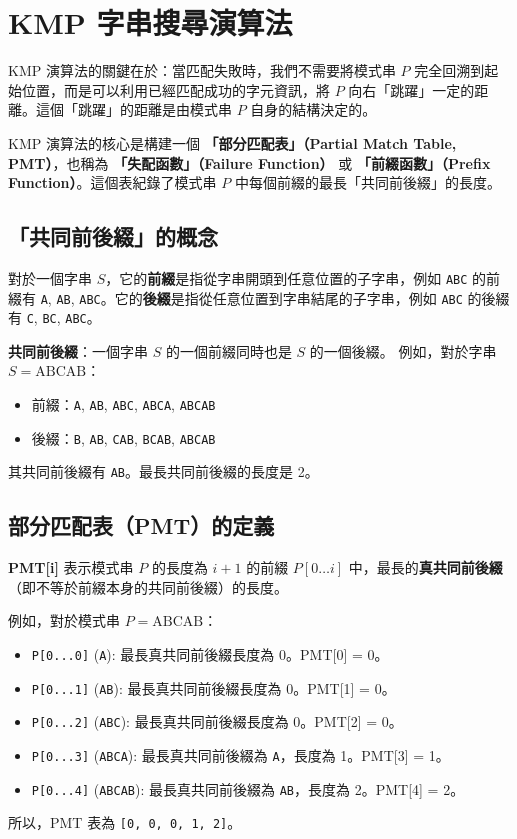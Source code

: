 \section{KMP 字串搜尋演算法}
KMP 演算法的關鍵在於：當匹配失敗時，我們不需要將模式串 $P$ 完全回溯到起始位置，而是可以利用已經匹配成功的字元資訊，將 $P$ 向右「跳躍」一定的距離。這個「跳躍」的距離是由模式串 $P$ 自身的結構決定的。

KMP 演算法的核心是構建一個 \textbf{「部分匹配表」（Partial Match Table, PMT）}，也稱為 \textbf{「失配函數」（Failure Function）} 或 \textbf{「前綴函數」（Prefix Function）}。這個表紀錄了模式串 $P$ 中每個前綴的最長「共同前後綴」的長度。

\subsection{「共同前後綴」的概念}
對於一個字串 $S$，它的\textbf{前綴}是指從字串開頭到任意位置的子字串，例如 \verb|ABC| 的前綴有 \verb|A|, \verb|AB|, \verb|ABC|。它的\textbf{後綴}是指從任意位置到字串結尾的子字串，例如 \verb|ABC| 的後綴有 \verb|C|, \verb|BC|, \verb|ABC|。

\textbf{共同前後綴}：一個字串 $S$ 的一個前綴同時也是 $S$ 的一個後綴。
例如，對於字串 $S = \text{ABCAB}$：
\begin{itemize}
    \item 前綴：\verb|A|, \verb|AB|, \verb|ABC|, \verb|ABCA|, \verb|ABCAB|
    \item 後綴：\verb|B|, \verb|AB|, \verb|CAB|, \verb|BCAB|, \verb|ABCAB|
\end{itemize}
其共同前後綴有 \verb|AB|。最長共同前後綴的長度是 2。

\subsection{部分匹配表（PMT）的定義}
\textbf{PMT[i]} 表示模式串 $P$ 的長度為 $i+1$ 的前綴 $P[0 \dots i]$ 中，最長的\textbf{真共同前後綴}（即不等於前綴本身的共同前後綴）的長度。

例如，對於模式串 $P = \text{ABCAB}$：
\begin{itemize}
    \item \verb|P[0...0]| (\verb|A|): 最長真共同前後綴長度為 0。PMT[0] = 0。
    \item \verb|P[0...1]| (\verb|AB|): 最長真共同前後綴長度為 0。PMT[1] = 0。
    \item \verb|P[0...2]| (\verb|ABC|): 最長真共同前後綴長度為 0。PMT[2] = 0。
    \item \verb|P[0...3]| (\verb|ABCA|): 最長真共同前後綴為 \verb|A|，長度為 1。PMT[3] = 1。
    \item \verb|P[0...4]| (\verb|ABCAB|): 最長真共同前後綴為 \verb|AB|，長度為 2。PMT[4] = 2。
\end{itemize}
所以，PMT 表為 \verb|[0, 0, 0, 1, 2]|。

